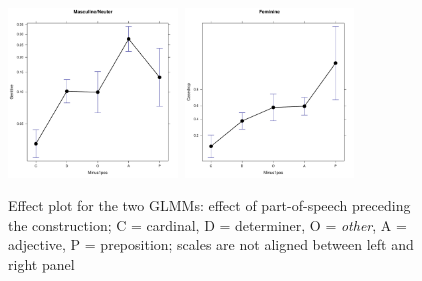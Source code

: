 \documentclass[USenglish]{article}
\begin{document}
\begin{figure}[h]
\centering
\includegraphics[width=0.4\textwidth]{figures/corpus/04_glmm_fixeff_mn_Minus1pos}~\includegraphics[width=0.4\textwidth]{figures/corpus/04_glmm_fixeff_fem_Minus1pos}
\caption{Effect plot for the two GLMMs: effect of part-of-speech preceding the construction; C = cardinal, D = determiner, O = \textit{other}, A = adjective, P = preposition; scales are not aligned between left and right panel}
\label{fig:glmm:fixef:minus1pos}
\end{figure}
\end{document}
